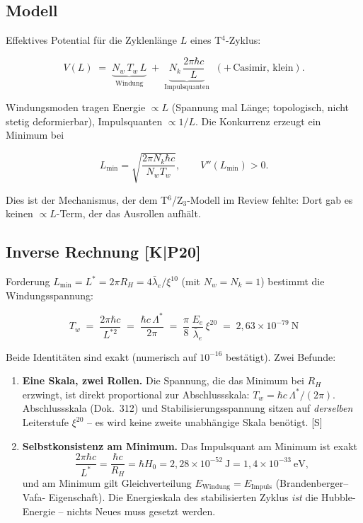 \documentclass[11pt]{report}
\begin{document}
\subsection{Modell}

Effektives Potential für die Zyklenlänge $L$ eines T$^4$-Zyklus:

\begin{equation}
  V(L) \;=\; \underbrace{N_w\,T_w\,L}_{\text{Windung}}
  \;+\; \underbrace{N_k\,\frac{2\pi\hbar c}{L}}_{\text{Impulsquanten}}
  \;\;(+\,\text{Casimir, klein}).
  \label{eq:pot}
\end{equation}

Windungsmoden tragen Energie $\propto L$ (Spannung mal Länge;
topologisch, nicht stetig deformierbar), Impulsquanten
$\propto 1/L$. Die Konkurrenz erzeugt ein Minimum bei

\begin{equation}
  L_{\min} = \sqrt{\frac{2\pi N_k \hbar c}{N_w T_w}},
  \qquad V''(L_{\min}) > 0.
\end{equation}

Dies ist der Mechanismus, der dem T$^6$/Z$_3$-Modell im Review
fehlte: Dort gab es keinen $\propto L$-Term, der das Ausrollen
aufhält.

\subsection{Inverse Rechnung [K|P20]}

Forderung $L_{\min} = L^{*} = 2\pi R_H = 4\bar\lambda_e/\xi^{10}$
(mit $N_w = N_k = 1$) bestimmt die Windungsspannung:

\begin{equation}
  \boxed{\;T_w \;=\; \frac{2\pi\hbar c}{L^{*2}}
  \;=\; \frac{\hbar c\,\Lambda^{*}}{2\pi}
  \;=\; \frac{\pi}{8}\,\frac{E_e}{\bar\lambda_e}\,\xi^{20}
  \;=\; 2{,}63\times10^{-79}~\text{N}\;}
  \label{eq:tw}
\end{equation}

Beide Identitäten sind exakt (numerisch auf $10^{-16}$ bestätigt).
Zwei Befunde:

\begin{enumerate}
  \item \textbf{Eine Skala, zwei Rollen.} Die Spannung, die das
        Minimum bei $R_H$ erzwingt, ist direkt proportional zur
        Abschlussskala: $T_w = \hbar c\,\Lambda^{*}/(2\pi)$.
        Abschlussskala (Dok.~312) und Stabilisierungsspannung sitzen
        auf \emph{derselben} Leiterstufe $\xi^{20}$ -- es wird keine
        zweite unabhängige Skala benötigt. [S]
  \item \textbf{Selbstkonsistenz am Minimum.} Das Impulsquant am
        Minimum ist exakt
        \[
          \frac{2\pi\hbar c}{L^{*}} = \frac{\hbar c}{R_H}
          = \hbar H_0 = 2{,}28\times10^{-52}~\text{J}
          = 1{,}4\times10^{-33}~\text{eV},
        \]
        und am Minimum gilt Gleichverteilung
        $E_\text{Windung} = E_\text{Impuls}$ (Brandenberger--Vafa-%
        Eigenschaft). Die Energieskala des stabilisierten Zyklus
        \emph{ist} die Hubble-Energie -- nichts Neues muss gesetzt
        werden.
\end{enumerate}
\end{document}
